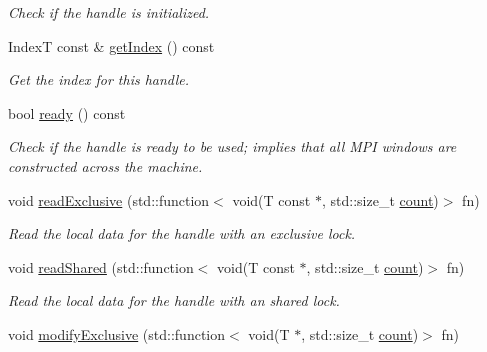 \begin{DoxyCompactItemize}
\begin{DoxyCompactList}\small\item\em Check if the handle is initialized. \end{DoxyCompactList}\item 
IndexT const  \& \hyperlink{structvt_1_1rdma_1_1_handle_3_01_t_00_01_e_00_01_index_t_00_01typename_01std_1_1enable__if__t_3_f66c3940d9f3649c3a5c3e77d63c658a_a37e164e4eb34320551c7641c5e2f123b}{get\+Index} () const
\begin{DoxyCompactList}\small\item\em Get the index for this handle. \end{DoxyCompactList}\item 
bool \hyperlink{structvt_1_1rdma_1_1_handle_3_01_t_00_01_e_00_01_index_t_00_01typename_01std_1_1enable__if__t_3_f66c3940d9f3649c3a5c3e77d63c658a_a860f35e2562f8ab0e5606281315d2e17}{ready} () const
\begin{DoxyCompactList}\small\item\em Check if the handle is ready to be used; implies that all M\+PI windows are constructed across the machine. \end{DoxyCompactList}\item 
void \hyperlink{structvt_1_1rdma_1_1_handle_3_01_t_00_01_e_00_01_index_t_00_01typename_01std_1_1enable__if__t_3_f66c3940d9f3649c3a5c3e77d63c658a_adc7b1058678ece326e044eac9d4c83cf}{read\+Exclusive} (std\+::function$<$ void(T const $\ast$, std\+::size\+\_\+t \hyperlink{structvt_1_1rdma_1_1_base_typed_handle_a1e7937b5cf4b641a783c37675ae2cc35}{count})$>$ fn)
\begin{DoxyCompactList}\small\item\em Read the local data for the handle with an exclusive lock. \end{DoxyCompactList}\item 
void \hyperlink{structvt_1_1rdma_1_1_handle_3_01_t_00_01_e_00_01_index_t_00_01typename_01std_1_1enable__if__t_3_f66c3940d9f3649c3a5c3e77d63c658a_a20ad220782a771d3b4b1a63b963f7adf}{read\+Shared} (std\+::function$<$ void(T const $\ast$, std\+::size\+\_\+t \hyperlink{structvt_1_1rdma_1_1_base_typed_handle_a1e7937b5cf4b641a783c37675ae2cc35}{count})$>$ fn)
\begin{DoxyCompactList}\small\item\em Read the local data for the handle with an shared lock. \end{DoxyCompactList}\item 
void \hyperlink{structvt_1_1rdma_1_1_handle_3_01_t_00_01_e_00_01_index_t_00_01typename_01std_1_1enable__if__t_3_f66c3940d9f3649c3a5c3e77d63c658a_a193a769321ba99cb7c999118d195d158}{modify\+Exclusive} (std\+::function$<$ void(T $\ast$, std\+::size\+\_\+t \hyperlink{structvt_1_1rdma_1_1_base_typed_handle_a1e7937b5cf4b641a783c37675ae2cc35}{count})$>$ fn)

\end{DoxyCompactItemize}
